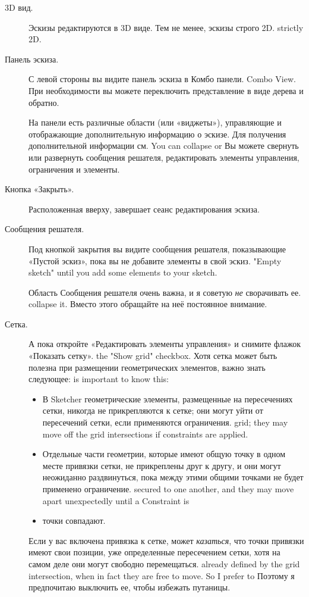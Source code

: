 \documentclass[12pt,titlepage]{article}
\begin{document}
\begin{description}
\item [3D вид.] Эскизы редактируются в 3D виде. Тем не менее, эскизы строго 2D.
      strictly 2D.
\item [Панель эскиза.] С левой стороны вы видите панель эскиза в Комбо панели.
      Combo View. При необходимости вы можете переключить представление в виде дерева и обратно.
      
      На панели есть различные области (или «виджеты»), управляющие и отображающие дополнительную информацию о эскизе.
      Для получения дополнительной информации см. You can collapse or
      Вы можете свернуть или развернуть сообщения решателя, редактировать элементы управления, ограничения и элементы.
\item [Кнопка «Закрыть».] Расположенная вверху, завершает сеанс редактирования эскиза.
\item [Сообщения решателя.] Под кнопкой закрытия вы видите сообщения решателя, показывающие «Пустой эскиз», пока вы не добавите элементы в свой эскиз.
      "Empty sketch" until you add some elements to your sketch.
      
      Область Сообщения решателя очень важна, и я советую \emph {не} сворачивать ее.
      collapse it. Вместо этого обращайте на неё  постоянное внимание.
\item [Сетка.] \label{GridSnap} А пока откройте «Редактировать элементы управления» и снимите флажок «Показать сетку».
      the "Show grid" checkbox. Хотя сетка может быть полезна при размещении геометрических элементов, важно знать следующее:
      is important to know this:
      \begin{itemize}
      \item В Sketcher геометрические элементы, размещенные на пересечениях сетки, никогда не прикрепляются к сетке; они могут уйти от пересечений сетки, если применяются ограничения.
            grid; they may move off the grid intersections if constraints are applied.
      \item Отдельные части геометрии, которые имеют общую точку в одном месте привязки сетки, не прикреплены друг к другу, и они могут неожиданно раздвинуться, пока между этими общими точками не будет применено ограничение.
            secured to one another, and they may move apart unexpectedly until a Constraint is
            \item точки совпадают.
      \end{itemize}

      Если у вас включена привязка к сетке, может {\em казаться}, что точки привязки имеют свои позиции, уже определенные пересечением сетки, хотя на самом деле они могут свободно перемещаться.
      already defined by the grid intersection, when in fact they are free to move. So I prefer to
      Поэтому я предпочитаю выключить ее, чтобы избежать путаницы.


\end{description}
\end{document}
